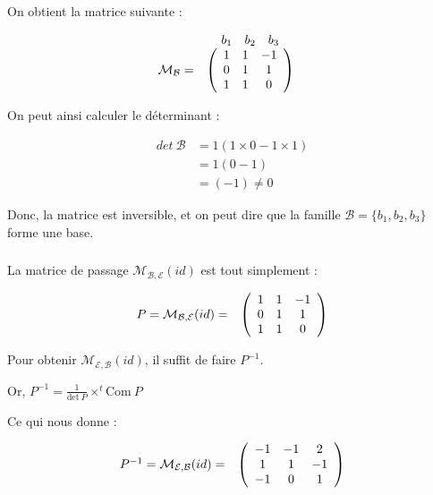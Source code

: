 \documentclass[a4paper,12pt]{article}
\begin{document}
On obtient la matrice suivante :


$$
\begin{array}{ccc}
  &\begin{array}{ccc} b_1&b_2&b_3 \end{array} & \\
  \mathcal{M}_{\mathcal{B}}=&\left(\begin{array}{c@{\hspace*{1em}}c@{\hspace*{1em}}c}
            1&1&-1\\
            0&1&1\\
            1&1&0 \end{array} \right) 
\end{array}
$$

On peut ainsi calculer le déterminant :

\begin{align*}
det\ \mathcal{B}&=1(1\times0-1\times1) \\
&=1(0-1) \\
&=(-1)\neq 0
\end{align*}

Donc, la matrice est inversible, et on peut dire que la famille $\mathcal{B}=\{b_1,b_2,b_3\}$ forme une base.

\subsubsection{}

La matrice de passage $\mathcal{M}_{\mathcal{B,E}}(id)$ est tout simplement :

$$
\begin{array}{ccc}
  P=\mathcal{M}_{\mathcal{B,E}}(id)=&\left(\begin{array}{c@{\hspace*{1em}}c@{\hspace*{1em}}c}
            1&1&-1\\
            0&1&1\\
            1&1&0 \end{array} \right) 
\end{array}
$$

Pour obtenir $\mathcal{M}_{\mathcal{E,B}}(id)$, il suffit de faire $P^{-1}.$

Or, $P^{-1}=\frac{1}{\mbox{det}\ P}\times ^t\mbox{Com}\ P$

Ce qui nous donne :

$$
\begin{array}{ccc}
    P^{-1}=\mathcal{M}_{\mathcal{E,B}}(id)=&\left(\begin{array}{c@{\hspace*{1em}}c@{\hspace*{1em}}c}
            -1&-1&2\\
            1&1&-1\\
            -1&0&1 \end{array} \right) 
\end{array}
$$
\end{document}
